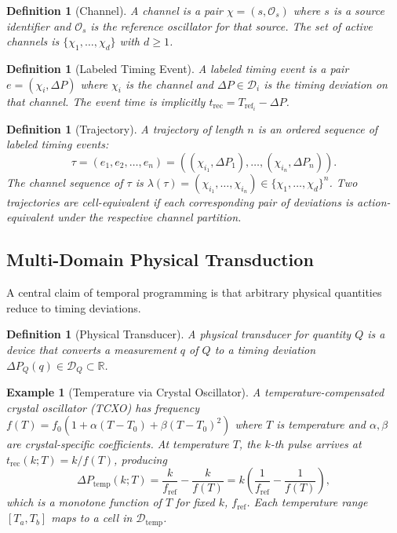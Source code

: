\documentclass[twocolumn,10pt]{article}
\newtheorem{definition}[theorem]{Definition}
\newtheorem{example}[theorem]{Example}
\newcommand{\DP}{\Delta P}          %
\newcommand{\Tref}{T_{\mathrm{ref}}}
\newcommand{\trec}{t_{\mathrm{rec}}}
\newcommand{\fref}{f_{\mathrm{ref}}}
\newcommand{\calD}{\mathcal{D}}     %
\begin{document}
\begin{definition}[Channel]
\label{def:channel}
A \emph{channel} is a pair $\chi = (s, \mathcal{O}_s)$ where $s$ is
a source identifier and $\mathcal{O}_s$ is the reference oscillator
for that source. The set of active channels is
$\{\chi_1, \ldots, \chi_d\}$ with $d \geq 1$.
\end{definition}

\begin{definition}[Labeled Timing Event]
\label{def:event}
A \emph{labeled timing event} is a pair $e = (\chi_i, \DP)$ where
$\chi_i$ is the channel and $\DP \in \calD_i$ is the timing
deviation on that channel. The event time is implicitly
$\trec = \Tref_i - \DP$.
\end{definition}

\begin{definition}[Trajectory]
\label{def:traj}
A \emph{trajectory of length $n$} is an ordered sequence of labeled
timing events:
\begin{equation}
  \tau = (e_1, e_2, \ldots, e_n) =
  ((\chi_{i_1}, \DP_1), \ldots, (\chi_{i_n}, \DP_n)).
  \label{eq:traj}
\end{equation}
The \emph{channel sequence} of $\tau$ is
$\lambda(\tau) = (\chi_{i_1}, \ldots, \chi_{i_n}) \in
\{\chi_1, \ldots, \chi_d\}^n$.
Two trajectories are \emph{cell-equivalent} if each corresponding
pair of deviations is action-equivalent under the respective channel
partition.
\end{definition}

\subsection{Multi-Domain Physical Transduction}

A central claim of temporal programming is that arbitrary physical
quantities reduce to timing deviations.

\begin{definition}[Physical Transducer]
\label{def:transducer}
A \emph{physical transducer for quantity $Q$} is a device that
converts a measurement $q$ of $Q$ to a timing deviation
$\DP_Q(q) \in \calD_Q \subset \mathbb{R}$.
\end{definition}

\begin{example}[Temperature via Crystal Oscillator]
\label{ex:temp}
A temperature-compensated crystal oscillator (TCXO) has frequency
$f(T) = f_0(1 + \alpha(T - T_0) + \beta(T - T_0)^2)$ where $T$ is
temperature and $\alpha, \beta$ are crystal-specific coefficients.
At temperature $T$, the $k$-th pulse arrives at
$\trec(k; T) = k / f(T)$, producing
\begin{equation}
  \DP_{\mathrm{temp}}(k; T)
  = \frac{k}{\fref} - \frac{k}{f(T)}
  = k \left(\frac{1}{\fref} - \frac{1}{f(T)}\right),
  \label{eq:dp-temp}
\end{equation}
which is a monotone function of $T$ for fixed $k$, $\fref$. Each
temperature range $[T_a, T_b]$ maps to a cell in $\calD_{\mathrm{temp}}$.
\end{example}
\end{document}
